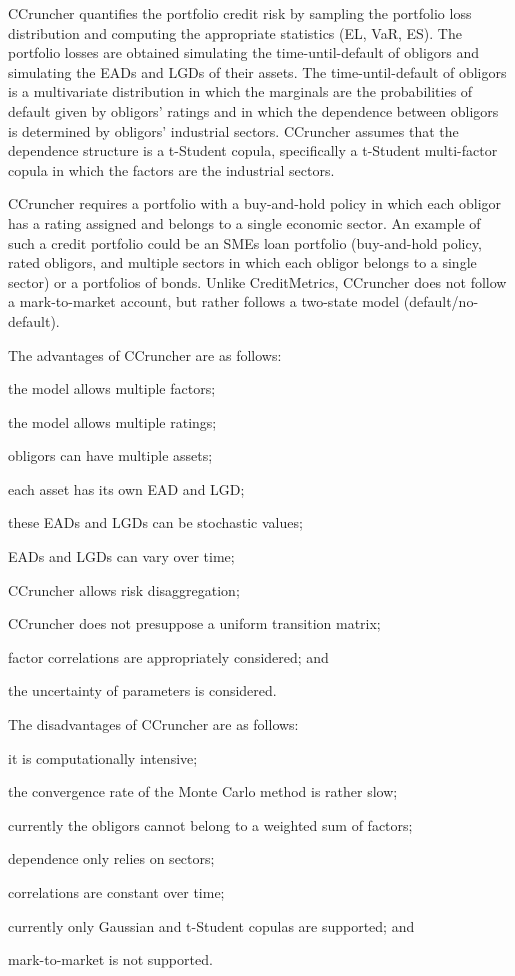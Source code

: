 \documentclass[11pt,fleqn]{book} %
\begin{document}
CCruncher quantifies the portfolio credit risk by sampling the portfolio loss
distribution and computing the appropriate statistics (EL, VaR, ES). The 
portfolio losses are obtained simulating the time-until-default of obligors 
and simulating the EADs and LGDs of their assets. The time-until-default of 
obligors is a multivariate distribution in which the marginals are the 
probabilities of default given by obligors' ratings and in which the dependence 
between obligors is determined by obligors' industrial sectors. CCruncher 
assumes that the dependence structure is a t-Student copula, specifically 
a t-Student multi-factor copula in which the factors are the industrial sectors.

CCruncher requires a portfolio with a buy-and-hold policy in which each obligor 
has a rating assigned and belongs to a single economic sector. An example of 
such a credit portfolio could be an SMEs loan portfolio (buy-and-hold policy, 
rated obligors, and multiple sectors in which each obligor belongs to a single 
sector) or a portfolios of bonds. Unlike CreditMetrics\texttrademark{}, CCruncher 
does not follow a mark-to-market account, but rather follows a two-state model 
(default/no-default). 

The advantages of CCruncher are as follows: 
\begin{inparaenum}[1)]
	\item the model allows multiple factors;
	\item the model allows multiple ratings;
	\item obligors can have multiple assets;
	\item each asset has its own EAD and LGD;
	\item these EADs and LGDs can be stochastic values;
	\item EADs and LGDs can vary over time; 
	\item CCruncher allows risk disaggregation;
	\item CCruncher does not presuppose a uniform transition matrix;
	\item factor correlations are appropriately considered; and
	\item the uncertainty of parameters is considered.
\end{inparaenum}

The disadvantages of CCruncher are as follows: 
\begin{inparaenum}[1)]
	\item it is computationally intensive;
	\item the convergence rate of the Monte Carlo method is rather slow;
	\item currently the obligors cannot belong to a weighted sum of factors;
	\item dependence only relies on sectors;
	\item correlations are constant over time;
	\item currently only Gaussian and t-Student copulas are supported; and
	\item mark-to-market is not supported.
\end{inparaenum}
\end{document}
